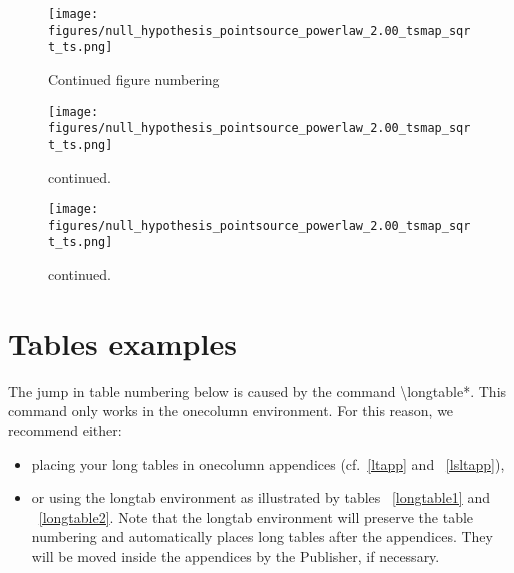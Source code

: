 \documentclass{aa}
\begin{document}

   \begin{figure}
   \centering
   \texttt{[image: figures/null\_hypothesis\_pointsource\_powerlaw\_2.00\_tsmap\_sqrt\_ts.png]}
      \caption{Continued figure numbering}
         \label{cont1}
   
   \centering
   \ContinuedFloat %
   \texttt{[image: figures/null\_hypothesis\_pointsource\_powerlaw\_2.00\_tsmap\_sqrt\_ts.png]}
         \caption{continued.}
            \label{cont2}

   \centering
   \ContinuedFloat %
   \texttt{[image: figures/null\_hypothesis\_pointsource\_powerlaw\_2.00\_tsmap\_sqrt\_ts.png]}
         \caption{continued.}
            \label{cont3}
   \end{figure}


\clearpage

\section{Tables examples}



The jump in table numbering below is caused by the command
\textbackslash longtable*. This command only works in the onecolumn
environment. For this reason, we recommend either:
\begin{itemize}
\item placing your long tables in onecolumn appendices (cf.~\ref{ltapp} and ~\ref{lsltapp}),
\item or using the longtab environment as illustrated by tables ~\ref{longtable1} and ~\ref{longtable2}.
Note that the longtab environment will preserve the table
numbering and automatically places long tables after the appendices.
They will be moved inside the appendices by the Publisher, if necessary.
\end{itemize}
\end{document}
